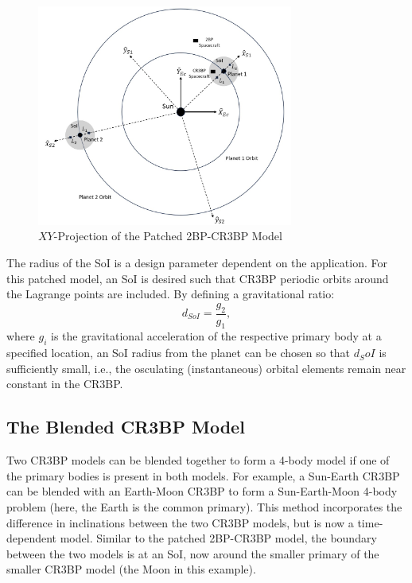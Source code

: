\begin{figure}[ht]
    \centering
    \includegraphics[width=0.75\textwidth]{figures/TBP-CR3BP.jpg}
    \caption{$XY$-Projection of the Patched 2BP-CR3BP Model}
    \label{fig:2BP-CR3BP}
\end{figure}

The radius of the SoI is a design parameter dependent on the application. For this patched model,
an SoI is desired such that CR3BP periodic orbits around the Lagrange points are included. By
defining a gravitational ratio:
\begin{equation}
    d_{SoI}=\frac{g_{2}}{g_{1}},
    \label{eq:patchedSoI}
\end{equation}
where $g_{i}$ is the gravitational acceleration of the respective primary body at a specified
location, an SoI radius from the planet can be chosen so that $d_SoI$ is sufficiently small, i.e.,
the osculating (instantaneous) orbital elements remain near constant in the
CR3BP\cite{Canales:2021}.

\subsection{The Blended CR3BP Model}
Two CR3BP models can be blended together to form a 4-body model if one of the primary bodies is
present in both models. For example, a Sun-Earth CR3BP can be blended with an Earth-Moon CR3BP to
form a Sun-Earth-Moon 4-body problem (here, the Earth is the common primary). This method
incorporates the difference in inclinations between the two CR3BP models, but is now a
time-dependent model\cite{Kakoi:2014}. Similar to the patched 2BP-CR3BP model, the boundary between
the two models is at an SoI, now around the smaller primary of the smaller CR3BP model (the Moon in
this example).

